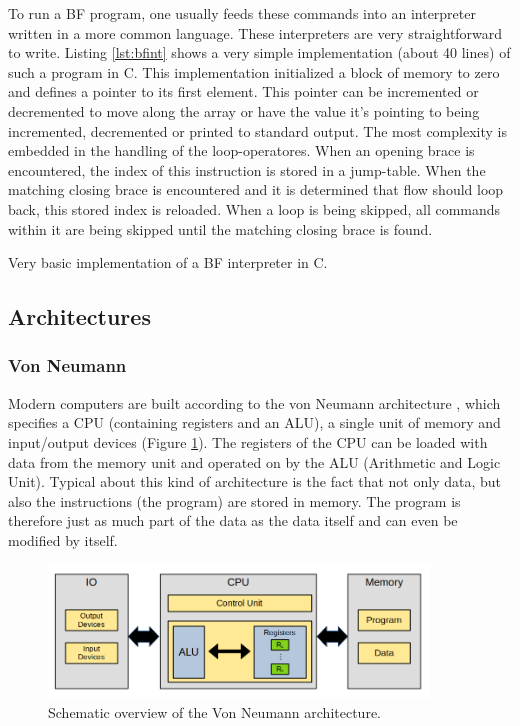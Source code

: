 To run a BF program, one usually feeds these commands into an interpreter written in a more common language. These interpreters are very straightforward to write. Listing \ref{lst:bfint} shows a very simple implementation (about 40 lines) of such a program in C. This implementation initialized a block of memory to zero and defines a pointer to its first element. This pointer can be incremented or decremented to move along the array or have the value it's pointing to being incremented, decremented or printed to standard output. The most complexity is embedded in the handling of the loop-operatores. When an opening brace is encountered, the index of this instruction is stored in a jump-table. When the matching closing brace is encountered and it is determined that flow should loop back, this stored index is reloaded. When a loop is being skipped, all commands within it are being skipped until the matching closing brace is found.

\begin{lstfloat}[H]
  
\caption{Very basic implementation of a BF interpreter in C.}
\label{lst:bfint}
\end{lstfloat}


\subsection{Architectures}
\subsubsection{Von Neumann}
Modern computers are built according to the von Neumann architecture \cite{vonneumann-wiki}, which specifies a CPU (containing registers and an ALU), a single unit of memory and input/output devices (Figure \ref{fig:vonneumann}). The registers of the CPU can be loaded with data from the memory unit and operated on by the ALU (Arithmetic and Logic Unit). Typical about this kind of architecture is the fact that not only data, but also the instructions (the program) are stored in memory. The program is therefore just as much part of the data as the data itself and can even be modified by itself.
\begin{figure}[H]
  \centering
  \includegraphics[width=0.9\textwidth]{img/vonneumann}
  \caption{Schematic overview of the Von Neumann architecture.}
  \label{fig:vonneumann}
\end{figure}

